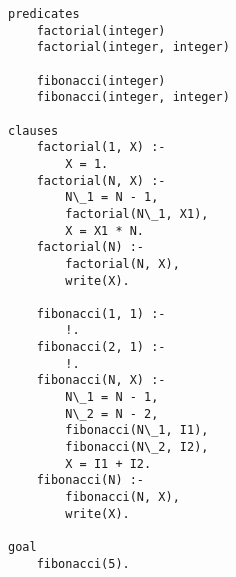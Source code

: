 \begin{lstlisting}[style=lispStyle, caption={ База знаний нахождения факториала и чисел фибоначчи},
                    label={lst:fact}]
predicates
    factorial(integer)
    factorial(integer, integer)

    fibonacci(integer)
    fibonacci(integer, integer)

clauses
    factorial(1, X) :-
        X = 1.
    factorial(N, X) :-
        N\_1 = N - 1,
        factorial(N\_1, X1),
        X = X1 * N.
    factorial(N) :-
        factorial(N, X),
        write(X).

    fibonacci(1, 1) :-
        !.
    fibonacci(2, 1) :-
        !.
    fibonacci(N, X) :-
        N\_1 = N - 1,
        N\_2 = N - 2,
        fibonacci(N\_1, I1),
        fibonacci(N\_2, I2),
        X = I1 + I2.
    fibonacci(N) :-
        fibonacci(N, X),
        write(X).

goal
    fibonacci(5).

\end{lstlisting}

